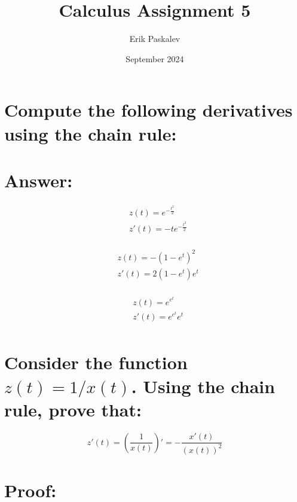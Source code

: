 \documentclass{article}
\title{Calculus Assignment 5}
\author{Erik Paskalev}
\date{September 2024}
\begin{document}
\maketitle

\section{\normalfont Compute the following derivatives using the chain rule:}

\section*{Answer:}

\begin{equation}
\begin{split}
& z(t) = e^{-\frac{t^2}{2}} \\
& z'(t) = -te^{-\frac{t^2}{2}} \\
\end{split}
\end{equation}

\begin{equation}
\begin{split}
& z(t) = -{(1-e^t)}^2 \\
& z'(t) = 2(1-e^t)e^t \\
\end{split}
\end{equation}

\begin{equation}
\begin{split}
& z(t) = e^{e^t} \\
& z'(t) = e^{e^t}e^t \\
\end{split}
\end{equation}

\section{\normalfont Consider the function $z(t) = 1/x(t)$. Using the chain rule, prove that:}

\begin{equation}
z'(t) = (\frac{1}{x(t)})' = -\frac{x'(t)}{{(x(t))}^2}
\end{equation}

\section*{Proof:}
\end{document}
